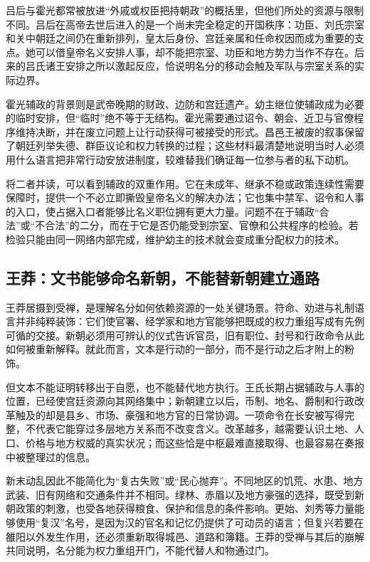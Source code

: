 吕后与霍光都常被放进“外戚或权臣把持朝政”的概括里，但他们所处的资源与限制不同。吕后在高帝去世后进入的是一个尚未完全稳定的开国秩序：功臣、刘氏宗室和关中朝廷之间仍在重新排列，皇太后身份、宫廷亲属和任命权因而成为重要的支点。她可以借皇帝名义安排人事，却不能把宗室、功臣和地方势力当作不存在。后来的吕氏诸王安排之所以激起反应，恰说明名分的移动会触及军队与宗室关系的实际边界。

霍光辅政的背景则是武帝晚期的财政、边防和宫廷遗产。幼主继位使辅政成为必要的临时安排，但“临时”绝不等于无结构。霍光需要通过诏令、朝会、近卫与官僚程序维持决断，并在废立问题上让行动获得可被接受的形式。昌邑王被废的叙事保留了朝廷列举失德、群臣议论和权力转换的过程；这些材料最清楚地说明当时人必须用什么语言把非常行动安放进制度，较难替我们确证每一位参与者的私下动机。

将二者并读，可以看到辅政的双重作用。它在未成年、继承不稳或政策连续性需要保障时，提供一个不必立即撕毁皇帝名义的解决办法；它也集中禁军、诏令和人事的入口，使占据入口者能够比名义职位拥有更大力量。问题不在于辅政“合法”或“不合法”的二分，而在于它是否仍能受到宗室、官僚和公共程序的检验。若检验只能由同一网络内部完成，维护幼主的技术就会变成重分配权力的技术。

\subsection{王莽：文书能够命名新朝，不能替新朝建立通路}

王莽居摄到受禅，是理解名分如何依赖资源的一处关键场景。符命、劝进与礼制语言并非纯粹装饰：它们使官署、经学家和地方官能够把既成的权力重组写成有先例可循的交接。新朝必须用可辨认的仪式告诉官员，旧有职位、封号和行政命令从此如何被重新解释。就此而言，文本是行动的一部分，而不是行动之后才附上的粉饰。

但文本不能证明转移出于自愿，也不能替代地方执行。王氏长期占据辅政与人事的位置，已经使宫廷资源向其网络集中；新朝建立以后，币制、地名、爵制和行政改革触及的却是县乡、市场、豪强和地方官的日常协调。一项命令在长安被写得完整，不代表它能穿过多层地方关系而不改变含义。改革越多，越需要认识土地、人口、价格与地方权威的真实状况；而这些恰是中枢最难直接取得、也最容易在奏报中被整理过的信息。

新末动乱因此不能简化为“复古失败”或“民心抛弃”。不同地区的饥荒、水患、地方武装、旧有网络和交通条件并不相同。绿林、赤眉以及地方豪强的选择，既受到新朝政策的刺激，也受各地获得粮食、保护和信息的条件影响。更始、刘秀等力量能够使用“复汉”名号，是因为汉的官名和记忆仍提供了可动员的语言；但复兴若要在雒阳以外发生作用，还必须重新取得城邑、道路和簿籍。王莽的受禅与其后的崩解共同说明，名分能为权力重组开门，不能代替人和物通过门。

